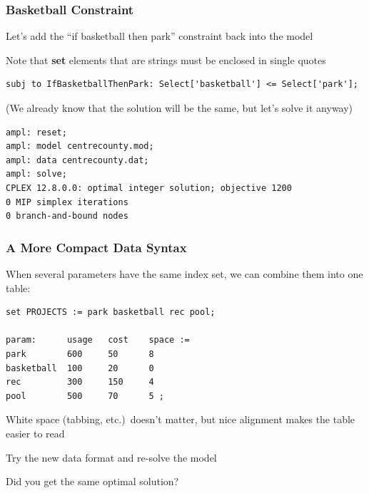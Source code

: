\begin{frame}[fragile]

	\frametitle{Basketball Constraint}

	\bit
	\item Let's add the ``if basketball then park'' constraint back into the model
	\item Note that {\bf set} elements that are strings must be enclosed in single quotes
	\eit
	
\begin{lstlisting}
subj to IfBasketballThenPark: Select['basketball'] <= Select['park'];
\end{lstlisting}

	\bit
	\item (We already know that the solution will be the same, but let's solve it anyway)
	\eit
	
\begin{lstlisting}
ampl: reset;
ampl: model centrecounty.mod;
ampl: data centrecounty.dat;
ampl: solve;
CPLEX 12.8.0.0: optimal integer solution; objective 1200
0 MIP simplex iterations
0 branch-and-bound nodes
\end{lstlisting}

\end{frame}

\begin{frame}[fragile]

	\frametitle{A More Compact Data Syntax}
	
	\bit
	\item When several parameters have the same index set, we can combine them into one table:
	\eit
	
\begin{lstlisting}
set PROJECTS := park basketball rec pool;
	
param:		usage	cost	space :=
park		600		50		8
basketball	100		20		0
rec			300		150		4
pool		500		70		5 ;
\end{lstlisting}

	\bit
	\item White space (tabbing, etc.)\ doesn't matter, but nice alignment makes the table easier to read
	\pause
	\item Try the new data format and re-solve the model
	\item Did you get the same optimal solution?
	\eit

\end{frame}

